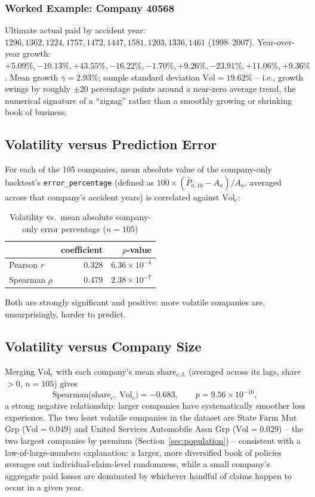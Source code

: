 \documentclass[11pt]{article}
\begin{document}
\subsubsection{Worked Example: Company 40568}

Ultimate actual paid by accident year: $1296, 1362, 1224, 1757, 1472, 1447, 1581, 1203, 1336,
1461$ (1998--2007). Year-over-year growth: $+5.09\%, -10.13\%, +43.55\%, -16.22\%, -1.70\%,
+9.26\%, -23.91\%, +11.06\%, +9.36\%$. Mean growth $\bar\gamma = 2.93\%$; sample standard
deviation $\text{Vol} = 19.62\%$ -- i.e., growth swings by roughly $\pm20$ percentage points
around a near-zero average trend, the numerical signature of a ``zigzag'' rather than a smoothly
growing or shrinking book of business.

\subsection{Volatility versus Prediction Error}

For each of the 105 companies, mean absolute value of the company-only backtest's
\texttt{error\_percentage} (defined as $100\times(\widehat{P}_{a,10}-A_{a})/A_{a}$, averaged
across that company's accident years) is correlated against $\text{Vol}_c$:

\begin{table}[h]
\centering
\caption{Volatility vs.\ mean absolute company-only error percentage ($n=105$)}
\begin{tabular}{lrr}
\toprule
& coefficient & $p$-value \\
\midrule
Pearson $r$  & 0.328 & $6.36\times10^{-4}$ \\
Spearman $\rho$ & 0.479 & $2.38\times10^{-7}$ \\
\bottomrule
\end{tabular}
\end{table}

Both are strongly significant and positive: more volatile companies are, unsurprisingly, harder
to predict.

\subsection{Volatility versus Company Size}

Merging $\text{Vol}_c$ with each company's mean $\text{share}_{c,L}$ (averaged across its lags,
share $>0$, $n=105$) gives
\begin{equation}
\text{Spearman}\bigl(\text{share}_c,\ \text{Vol}_c\bigr) = -0.683, \qquad p = 9.56\times10^{-16},
\end{equation}
a strong negative relationship: larger companies have systematically smoother loss experience.
The two least volatile companies in the dataset are State Farm Mut Grp ($\text{Vol}=0.049$) and
United Services Automobile Assn Grp ($\text{Vol}=0.029$) -- the two largest companies by premium
(Section~\ref{sec:population}) -- consistent with a law-of-large-numbers explanation: a larger,
more diversified book of policies averages out individual-claim-level randomness, while a small
company's aggregate paid losses are dominated by whichever handful of claims happen to occur in a
given year.
\end{document}
